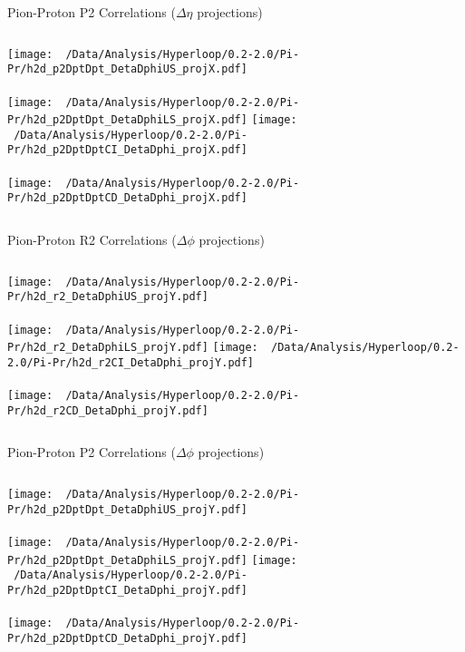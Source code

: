 \documentclass{beamer}
\begin{document}
\begin{frame}{Pion-Proton P2 Correlations ($\Delta\eta$ projections)}
	\begin{columns}
		\centering
		\texttt{[image: ~/Data/Analysis/Hyperloop/0.2-2.0/Pi-Pr/h2d\_p2DptDpt\_DetaDphiUS\_projX.pdf]}\\~\\
		\texttt{[image: ~/Data/Analysis/Hyperloop/0.2-2.0/Pi-Pr/h2d\_p2DptDpt\_DetaDphiLS\_projX.pdf]}
		\centering
		\texttt{[image: ~/Data/Analysis/Hyperloop/0.2-2.0/Pi-Pr/h2d\_p2DptDptCI\_DetaDphi\_projX.pdf]}\\~\\
		\texttt{[image: ~/Data/Analysis/Hyperloop/0.2-2.0/Pi-Pr/h2d\_p2DptDptCD\_DetaDphi\_projX.pdf]}
	\end{columns}
\end{frame}
\begin{frame}{Pion-Proton R2 Correlations ($\Delta\phi$ projections)}
	\begin{columns}
		\column{0.5\linewidth}
		\centering
		\texttt{[image: ~/Data/Analysis/Hyperloop/0.2-2.0/Pi-Pr/h2d\_r2\_DetaDphiUS\_projY.pdf]}\\~\\
		\texttt{[image: ~/Data/Analysis/Hyperloop/0.2-2.0/Pi-Pr/h2d\_r2\_DetaDphiLS\_projY.pdf]}
		\column{0.5\linewidth}
		\centering
		\texttt{[image: ~/Data/Analysis/Hyperloop/0.2-2.0/Pi-Pr/h2d\_r2CI\_DetaDphi\_projY.pdf]}\\~\\
		\texttt{[image: ~/Data/Analysis/Hyperloop/0.2-2.0/Pi-Pr/h2d\_r2CD\_DetaDphi\_projY.pdf]}
	\end{columns}
\end{frame}
\begin{frame}{Pion-Proton P2 Correlations ($\Delta\phi$ projections)}
	\begin{columns}
		\centering
		\texttt{[image: ~/Data/Analysis/Hyperloop/0.2-2.0/Pi-Pr/h2d\_p2DptDpt\_DetaDphiUS\_projY.pdf]}\\~\\
		\texttt{[image: ~/Data/Analysis/Hyperloop/0.2-2.0/Pi-Pr/h2d\_p2DptDpt\_DetaDphiLS\_projY.pdf]}
		\centering
		\texttt{[image: ~/Data/Analysis/Hyperloop/0.2-2.0/Pi-Pr/h2d\_p2DptDptCI\_DetaDphi\_projY.pdf]}\\~\\
		\texttt{[image: ~/Data/Analysis/Hyperloop/0.2-2.0/Pi-Pr/h2d\_p2DptDptCD\_DetaDphi\_projY.pdf]}
	\end{columns}
\end{frame}
\end{document}
